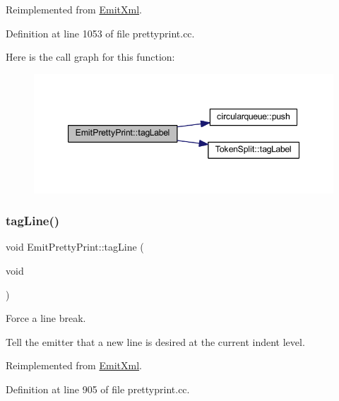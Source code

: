 Reimplemented from \mbox{\hyperlink{class_emit_xml_a647841bd4102de3af8ca0f8dd734ac6b}{Emit\+Xml}}.



Definition at line 1053 of file prettyprint.\+cc.

Here is the call graph for this function\+:
\nopagebreak
\begin{figure}[H]
\begin{center}
\leavevmode
\includegraphics[width=347pt]{class_emit_pretty_print_a6da4bd229730cce20996e9611d5deffd_cgraph}
\end{center}
\end{figure}
\mbox{\label{class_emit_pretty_print_a986da682a9a028e8cf7ee8162f941014}} 
\subsubsection{\texorpdfstring{tagLine()}{tagLine()}\hspace{0.1cm}{\footnotesize\ttfamily [1/2]}}
{\footnotesize\ttfamily void Emit\+Pretty\+Print\+::tag\+Line (\begin{DoxyParamCaption}\item[{void}]{ }\end{DoxyParamCaption})\hspace{0.3cm}{\ttfamily [virtual]}}



Force a line break. 

Tell the emitter that a new line is desired at the current indent level. 

Reimplemented from \mbox{\hyperlink{class_emit_xml_a2c98eede26b667575347382df89ab310}{Emit\+Xml}}.



Definition at line 905 of file prettyprint.\+cc.

